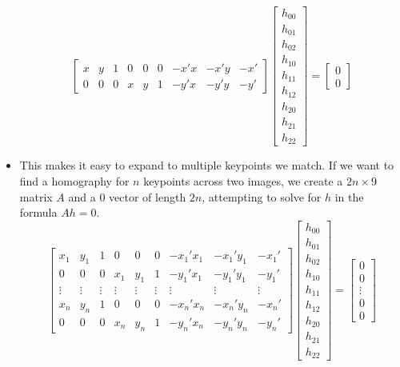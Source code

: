 \documentclass{article}
\begin{document}
\begin{itemize}
$$\begin{bmatrix}
    x & y & 1 & 0 & 0 & 0 & -x'x & -x'y & -x' \\
    0 & 0 & 0 & x & y & 1 & -y'x & -y'y & -y'
    \end{bmatrix}\begin{bmatrix}
    h_{00} \\ h_{01} \\ h_{02}\\ h_{10} \\ h_{11} \\ h_{12} \\ h_{20} \\ h_{21} \\ h_{22}
    \end{bmatrix} = \begin{bmatrix}
    0 \\ 0
    \end{bmatrix}$$
    \item This makes it easy to expand to multiple keypoints we match. If we want to find a homography for $n$ keypoints across two images, we create a $2n \times 9$ matrix $A$ and a $0$ vector of length $2n$, attempting to solve for $h$ in the formula $Ah = 0$.
    $$\begin{bmatrix}
    x_1 & y_1 & 1 & 0 & 0 & 0 & -x_1'x_1 & -x_1'y_1 & -x_1' \\
    0 & 0 & 0 & x_1 & y_1 & 1 & -y_1'x_1 & -y_1'y_1 & -y_1' \\ 
    \vdots &\vdots &\vdots &\vdots &\vdots &\vdots &\vdots &\vdots &\vdots \\
    x_n & y_n & 1 & 0 & 0 & 0 & -x_n'x_n & -x_n'y_n & -x_n' \\
    0 & 0 & 0 & x_n & y_n & 1 & -y_n'x_n & -y_n'y_n & -y_n'
    \end{bmatrix}\begin{bmatrix}
    h_{00} \\ h_{01} \\ h_{02}\\ h_{10} \\ h_{11} \\ h_{12} \\ h_{20} \\ h_{21} \\ h_{22}
    \end{bmatrix} = \begin{bmatrix}
    0 \\ 0 \\ \vdots \\0 \\0
    \end{bmatrix}$$

\end{itemize}
\end{document}
